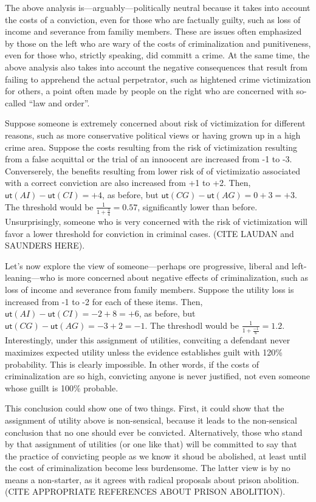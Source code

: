 \documentclass[10pt,dvipsnames,enabledeprecatedfontcommands]{scrartcl}
\newcommand{\ut}{\mathsf{ut}}
\begin{document}
The above analysis is---arguably---politically neutral because it takes
into account the costs of a conviction, even for those who are factually
guilty, such as loss of income and severance from familiy members. These
are issues often emphasized by those on the left who are wary of the
costs of criminalization and punitiveness, even for those who, strictly
speaking, did committ a crime. At the same time, the above analysis also
takes into account the negative consequences that result from failing to
apprehend the actual perpetrator, such as hightened crime victimization
for others, a point often made by people on the right who are concerned
with so-called ``law and order''.

Suppose someone is extremely concerned about risk of victimization for
different reasons, such as more conservative political views or having
grown up in a high crime area. Suppose the costs resulting from the risk
of victimization resulting from a false acquittal or the trial of an
innoocent are increased from -1 to -3. Converserely, the benefits
resulting from lower risk of of victimizatio associated with a correct
conviction are also increased from +1 to +2. Then,
\(\ut(AI)-\ut(CI)=+4\), as before, but \(\ut(CG)-\ut(AG)=0+3=+3\). The
threshold would be \(\frac{1}{1+\frac{3}{4}}=0.57\), significantly lower
than before. Unsurprisingly, someone who is very concerned with the risk
of victimization will favor a lower threshold for conviction in criminal
cases. (CITE LAUDAN and SAUNDERS HERE).

Let's now explore the view of someone---perhaps ore progressive, liberal
and left-leaning---who is more concerned about negative effects of
criminalization, such as loss of income and severance from family
members. Suppose the utility loss is increased from -1 to -2 for each of
these items. Then, \(\ut(AI)-\ut(CI)=-2+8=+6\), as before, but
\(\ut(CG)-\ut(AG)=-3+2=-1\). The threshodl would be
\(\frac{1}{1+\frac{-1}{6}}=1.2\). Interestingly, under this assignment
of utilities, convciting a defendant never maximizes expected utility
unless the evidence establishes guilt with 120\% probability. This is
clearly impossible. In other words, if the costs of criminalization are
so high, convicting anyone is never justified, not even someone whose
guillt is 100\% probable.

This conclusion could show one of two things. First, it could show that
the assignment of utility above is non-sensical, because it leads to the
non-sensical conclusion that no one should ever be convicted.
Alternatively, those who stand by that assignment of utilities (or one
like that) will be committed to say that the practice of convicting
people as we know it shoud be abolished, at least until the cost of
criminalization become less burdensome. The latter view is by no means a
non-starter, as it agrees with radical proposals about prison abolition.
(CITE APPROPRIATE REFERENCES ABOUT PRISON ABOLITION).
\end{document}
